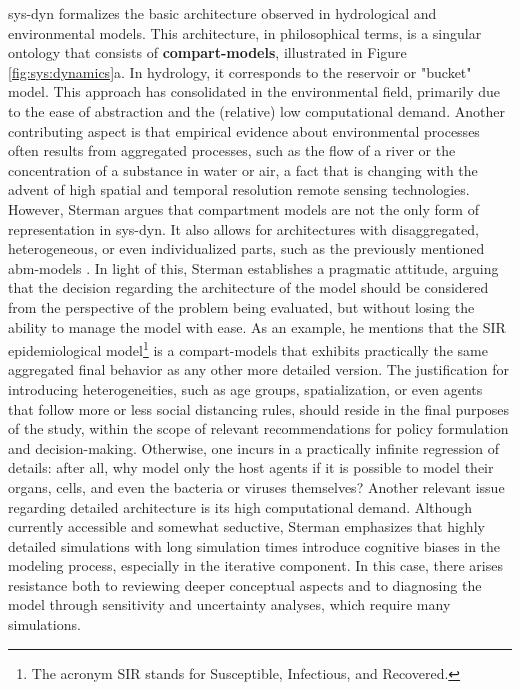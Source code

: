 \documentclass[./main_en.tex]{subfiles}
\begin{document}
\par \gls{sys-dyn} formalizes the basic architecture observed in hydrological and environmental models. This architecture, in philosophical terms, is a singular ontology that consists of \textbf{\gls{compart-models}}, illustrated in Figure \ref{fig:sys:dynamics}a. In \gls{hydrology}, it corresponds to the reservoir or "bucket" model. This approach has consolidated in the environmental field, primarily due to the ease of \gls{abstraction} and the (relative) low computational demand. Another contributing aspect is that empirical evidence about environmental processes often results from aggregated processes, such as the flow of a river or the concentration of a substance in water or air, a fact that is changing with the advent of high spatial and temporal resolution remote sensing technologies. However, Sterman argues that compartment models are not the only form of representation in \gls{sys-dyn}. It also allows for architectures with disaggregated, heterogeneous, or even individualized parts, such as the previously mentioned \gls{abm-models} \cite{sterman2018}. In light of this, Sterman establishes a pragmatic attitude, arguing that the decision regarding the architecture of the \gls{model} should be considered from the perspective of the problem being evaluated, but without losing the ability to manage the \gls{model} with ease. As an example, he mentions that the SIR epidemiological model\footnote{The acronym SIR stands for Susceptible, Infectious, and Recovered.} is a \gls{compart-models} that exhibits practically the same aggregated final behavior as any other more detailed version. The justification for introducing heterogeneities, such as age groups, spatialization, or even agents that follow more or less social distancing rules, should reside in the final purposes of the study, within the scope of relevant recommendations for policy formulation and decision-making. Otherwise, one incurs in a practically infinite regression of details: after all, why model only the host agents if it is possible to model their organs, cells, and even the bacteria or viruses themselves? Another relevant issue regarding detailed architecture is its high computational demand. Although currently accessible and somewhat seductive, Sterman emphasizes that highly detailed simulations with long simulation times introduce cognitive biases in the modeling process, especially in the iterative component. In this case, there arises resistance both to reviewing deeper conceptual aspects and to diagnosing the \gls{model} through sensitivity and uncertainty analyses, which require many simulations.
\end{document}

